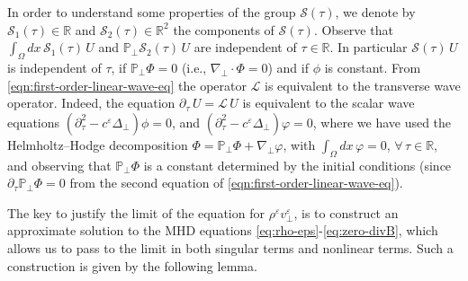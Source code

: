 \documentclass[11pt,reqno]{amsart}
\def \R{{\mathbb{R}}}
\def \P{{\mathbb{P}}}
\begin{document}
In order to understand some properties of the group $\mathcal S(\tau)$, we denote by $\mathcal S_1(\tau) \in \R $ and $\mathcal S_2(\tau) \in\R^2$ the components of  $\mathcal S(\tau)$.  Observe that $\int_{\Omega} dx\,\mathcal  S_1(\tau)\, U$ and $\P_\perp \mathcal S_2(\tau) \,U$ are independent of $\tau\in\R$. In particular $\mathcal S(\tau) \,U$ is independent of $\tau$, if $\P_\perp \Phi =0$ (i.e., $\nabla_\perp\cdot \Phi =0$) and if $\phi$ is constant. From \eqref{eqn:first-order-linear-wave-eq} the operator $\mathcal L$ is equivalent to the transverse wave operator. Indeed, the equation $\partial_\tau \, U = \mathcal{L}\, U$ is equivalent to the scalar wave equations $(\partial_\tau^2 -c^\varepsilon \Delta_\perp)\phi=0$, and $(\partial_\tau^2 -c^\varepsilon \Delta_\perp)\varphi=0$, where we have used the Helmholtz--Hodge decomposition $\Phi= \P_\perp \Phi + \nabla_\perp \varphi$, with $\int_{\Omega} dx\, \varphi =0$, $\forall \, \tau\in\R$, and observing that $\P_\perp \Phi$ is a constant determined by the initial conditions (since $\partial_\tau \P_\perp \Phi=0$ from the second equation of \eqref{eqn:first-order-linear-wave-eq}).\newline


The key to justify the limit of the equation for $\rho^\varepsilon v_\perp^\varepsilon $,
is to construct an approximate solution to the MHD equations \eqref{eq:rho-eps}-\eqref{eq:zero-divB}, which allows
us to pass to the limit in both singular terms and nonlinear terms. Such a construction is given by the following lemma.
\end{document}
